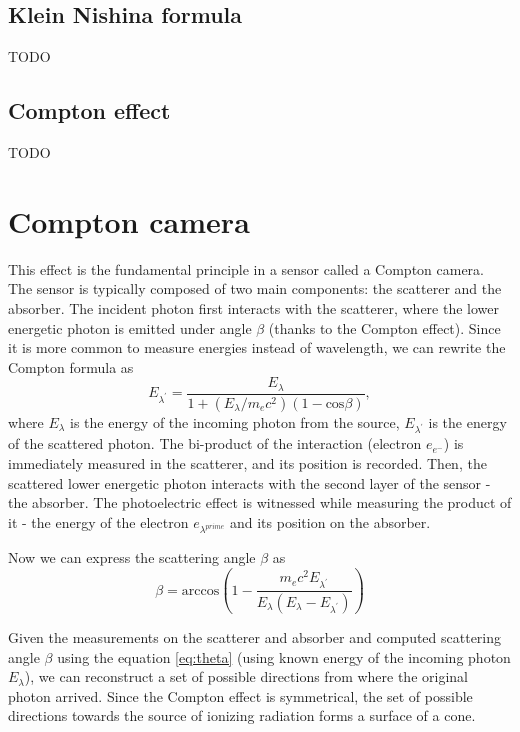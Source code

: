 {  \subsection{Klein Nishina formula}
  TODO

  \subsection{Compton effect}
  TODO


  \section{Compton camera}
  This effect is the fundamental principle in a sensor called a Compton camera. 
  The sensor is typically composed of two main components: the scatterer and the absorber. 
  The incident photon first interacts with the scatterer, where the lower energetic photon is emitted under angle $\beta$ (thanks to the Compton effect). 
  Since it is more common to measure energies instead of wavelength, we can rewrite the Compton formula as
  \begin{equation}
  E_{\lambda^{\prime}} = \frac{E_{\lambda}}{  1 + (E_{\lambda} / m_{e}c^{2}) (1 - \mathrm{cos} \beta)},
  \end{equation}
  where $E_{\lambda}$ is the energy of the incoming photon from the source, $E_{\lambda^{\prime}}$ is the energy of the scattered photon.  
  The bi-product of the interaction (electron $e_{e^{-}}$) is immediately measured in the scatterer, and its position is recorded.
  Then, the scattered lower energetic photon interacts with the second layer of the sensor - the absorber. 
  The photoelectric effect is witnessed while measuring the product of it - the energy of the electron $e_{\lambda^{prime}}$ and its position on the absorber.

  Now we can express the scattering angle $\beta$ as
  \begin{equation}
      \beta = \mathrm{arccos} \left (  1-\frac{m_{e}c^{2}E_{\lambda^{\prime}}}{E_{\lambda} (E_{\lambda} - E_{\lambda^{\prime}})} \right )
  \end{equation}

  Given the measurements on the scatterer and absorber and computed scattering angle $\beta$ using the equation \ref{eq:theta} (using known energy of the incoming photon $E_{\lambda}$), we can reconstruct a set of possible directions from where the original photon arrived. Since the Compton effect is symmetrical, the set of possible directions towards the source of ionizing radiation forms a surface of a cone.



}
